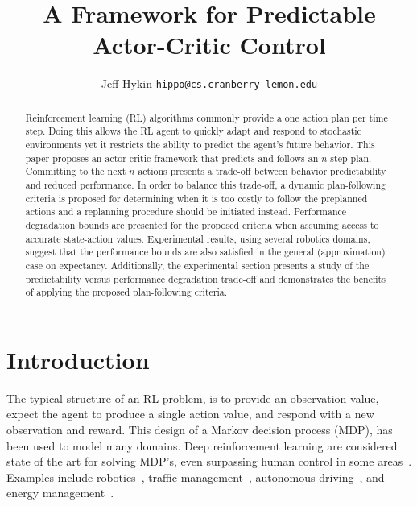 \documentclass{article}
\title{A Framework for Predictable Actor-Critic Control}
\author{%
    Jeff Hykin
    \texttt{hippo@cs.cranberry-lemon.edu} \\
}
\begin{document}
    \maketitle
    \begin{abstract}
        Reinforcement learning (RL) algorithms commonly provide a one action plan per time step. Doing this allows the RL agent to quickly adapt and respond to stochastic environments yet it restricts the ability to predict the agent's future behavior. This paper proposes an actor-critic framework that predicts and follows an $n$-step plan. Committing to the next $n$ actions presents a trade-off between behavior predictability and reduced performance. In order to balance this trade-off, a dynamic plan-following criteria is proposed for determining when it is too costly to follow the preplanned actions and a replanning procedure should be initiated instead. 
        Performance degradation bounds are presented for the proposed criteria when assuming access to accurate state-action values. Experimental results, using several robotics domains, suggest that the performance bounds are also satisfied in the general (approximation) case on expectancy. Additionally, the experimental section presents a study of the predictability versus performance degradation trade-off and demonstrates the benefits of applying the proposed plan-following criteria. 

    \end{abstract}

    \section{Introduction}
        
        
        The typical structure of an RL problem, is to provide an observation value, expect the agent to produce a single action value, and respond with a new observation and reward. This design of a Markov decision process (MDP), has been used to model many domains. Deep reinforcement learning are considered state of the art for solving MDP's, even surpassing human control in some areas~\cite{haarnoja2018soft,schulman2017proximal,mnih2015human}. Examples include robotics~\cite{haarnoja2018soft,dey2021jirl}, traffic management~\cite{Ault2021signals,ault2020learning}, autonomous driving~\cite{8793742,sallab2017deep}, and energy management~\cite{gao2014machine,vandael2015reinforcement}. 
        
\end{document}
